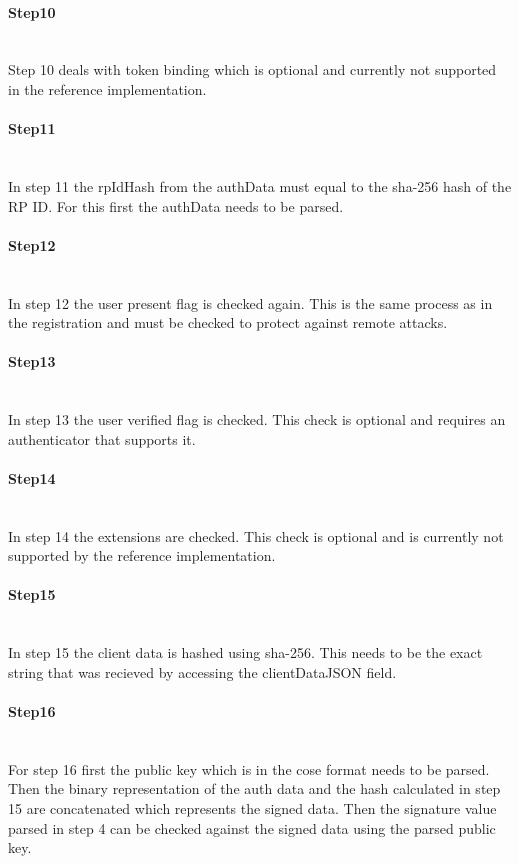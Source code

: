 \documentclass[a4paper, 11pt]{scrartcl}
\begin{document}
\paragraph{Step10}\hfill \\ 
Step 10 deals with token binding which is optional and currently not supported in the reference implementation.

\paragraph{Step11}\hfill \\ 
In step 11 the rpIdHash from the authData must equal to the \gls{sha-256} hash of the RP ID. For this first the authData needs to be parsed. 

\paragraph{Step12}\hfill \\ 
In step 12 the user present flag is checked again. This is the same process as in the registration and must be checked to protect against remote attacks.

\paragraph{Step13}\hfill \\ 
In step 13 the user verified flag is checked. This check is optional and requires an authenticator that supports it.

\paragraph{Step14}\hfill \\ 
In step 14 the extensions are checked. This check is optional and is currently not supported by the reference implementation.

\paragraph{Step15}\hfill \\ 
In step 15 the client data is hashed using \gls{sha-256}. This needs to be the exact string that was recieved by accessing the clientDataJSON field.

\paragraph{Step16}\hfill \\ 
For step 16 first the public key which is in the \gls{cose} format needs to be parsed. Then the binary representation of the auth data and the hash calculated in step 15 are concatenated which represents the signed data. Then the signature value parsed in step 4 can be checked against the signed data using the parsed public key. 
\end{document}

